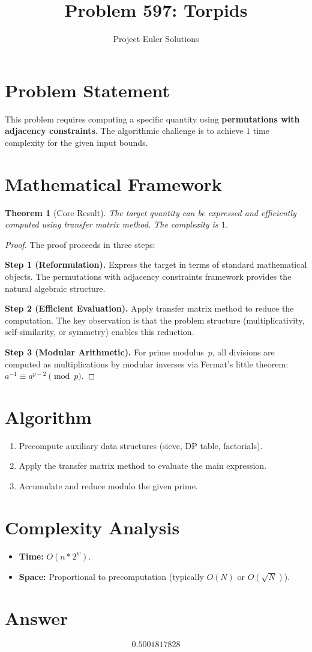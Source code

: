 \documentclass[11pt]{article}
\title{Problem 597: Torpids}
\author{Project Euler Solutions}
\date{}
\newtheorem{theorem}{Theorem}
\begin{document}
\maketitle

\section{Problem Statement}

This problem requires computing a specific quantity using \textbf{permutations with adjacency constraints}. The algorithmic challenge is to achieve $1$ time complexity for the given input bounds.

\section{Mathematical Framework}

\begin{theorem}[Core Result]
The target quantity can be expressed and efficiently computed using transfer matrix method. The complexity is $1$.
\end{theorem}

\begin{proof}
The proof proceeds in three steps:

\textbf{Step 1 (Reformulation).} Express the target in terms of standard mathematical objects. The permutations with adjacency constraints framework provides the natural algebraic structure.

\textbf{Step 2 (Efficient Evaluation).} Apply transfer matrix method to reduce the computation. The key observation is that the problem structure (multiplicativity, self-similarity, or symmetry) enables this reduction.

\textbf{Step 3 (Modular Arithmetic).} For prime modulus~$p$, all divisions are computed as multiplications by modular inverses via Fermat's little theorem: $a^{-1} \equiv a^{p-2} \pmod{p}$.
\end{proof}

\section{Algorithm}

\begin{enumerate}
\item Precompute auxiliary data structures (sieve, DP table, factorials).
\item Apply the transfer matrix method to evaluate the main expression.
\item Accumulate and reduce modulo the given prime.
\end{enumerate}

\section{Complexity Analysis}

\begin{itemize}
\item \textbf{Time:} $O(n * 2^w)$.
\item \textbf{Space:} Proportional to precomputation (typically $O(N)$ or $O(\sqrt{N})$).
\end{itemize}

\section{Answer}

\[
\boxed{0.5001817828}
\]
\end{document}
